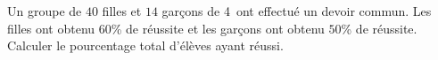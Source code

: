 
Un groupe de $40$ filles et \( 14\) garçons de 4\ieme\ ont effectué un devoir commun. Les filles ont obtenu $60$\% de réussite et les garçons ont obtenu $50$\% de réussite. Calculer le pourcentage total d'élèves ayant réussi.
